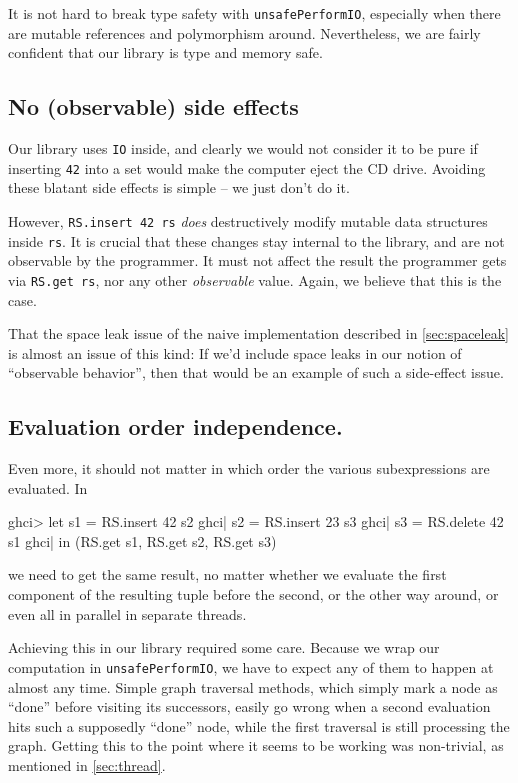\documentclass[manuscript,anonymous,screen,acmsmall]{acmart}
\begin{document}
It is not hard to break type safety with \verb|unsafePerformIO|, especially when there are mutable references and polymorphism around. Nevertheless, we are fairly confident that our library is type and memory safe.

\subsection{No (observable) side effects}

Our library uses \verb|IO| inside, and clearly we would not consider it to be pure if inserting \verb|42| into a set would make the computer eject the CD drive. Avoiding these blatant side effects is simple -- we just don't do it.

However, \verb|RS.insert 42 rs| \emph{does} destructively modify mutable data structures inside \verb|rs|. It is crucial that these changes stay internal to the library, and are not observable by the programmer. It must not affect the result the programmer gets via \verb|RS.get rs|, nor any other \emph{observable} value. Again, we believe that this is the case.

That the space leak issue of the naive implementation described in \cref{sec:spaceleak} is almost an issue of this kind: If we’d include space leaks in our notion of “observable behavior”, then that would be an example of such a side-effect issue.

\subsection{Evaluation order independence.}

Even more, it should not matter in which order the various subexpressions are evaluated. In
\begin{code}
ghci> let  s1 = RS.insert 42 s2
ghci|      s2 = RS.insert 23 s3
ghci|      s3 = RS.delete 42 s1
ghci| in (RS.get s1, RS.get s2, RS.get s3)
\end{code}
we need to get the same result, no matter whether we evaluate the first component of the resulting tuple before the second, or the other way around, or even all in parallel in separate threads.

Achieving this in our library required some care. Because we wrap our computation in \verb|unsafePerformIO|, we have to expect any of them to happen at almost any time. Simple graph traversal methods, which simply mark a node as “done” before visiting its successors, easily go wrong when a second evaluation hits such a supposedly “done” node, while the first traversal is still processing the graph. Getting this to the point where it seems to be working was non-trivial, as mentioned in \cref{sec:thread}.
\end{document}
